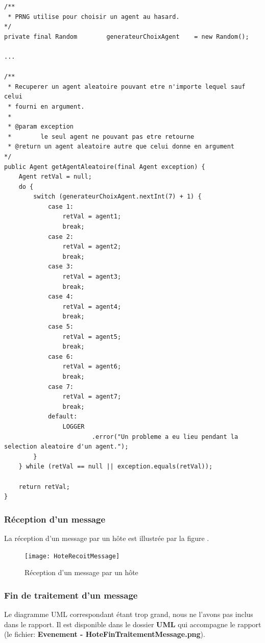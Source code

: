 \documentclass[a4paper,11pt]{article}
\begin{document}
\begin{lstlisting}[caption=Utilisation des variables aléatoires pour sélectionner un agent]
/**
 * PRNG utilise pour choisir un agent au hasard.
*/
private final Random		generateurChoixAgent	= new Random();
	
...

/**
 * Recuperer un agent aleatoire pouvant etre n'importe lequel sauf celui
 * fourni en argument.
 * 
 * @param exception
 *        le seul agent ne pouvant pas etre retourne
 * @return un agent aleatoire autre que celui donne en argument
*/
public Agent getAgentAleatoire(final Agent exception) {
	Agent retVal = null;
	do {
		switch (generateurChoixAgent.nextInt(7) + 1) {
			case 1:
				retVal = agent1;
				break;
			case 2:
				retVal = agent2;
				break;
			case 3:
				retVal = agent3;
				break;
			case 4:
				retVal = agent4;
				break;
			case 5:
				retVal = agent5;
				break;
			case 6:
				retVal = agent6;
				break;
			case 7:
				retVal = agent7;
				break;
			default:
				LOGGER
						.error("Un probleme a eu lieu pendant la selection aleatoire d'un agent.");
		}
	} while (retVal == null || exception.equals(retVal));
	
	return retVal;
}
\end{lstlisting}

\clearpage











\subsubsection{Réception d'un message}
La réception d'un message par un hôte est illustrée par la figure .

\begin{figure}[h!t]
  \centering
    \texttt{[image: HoteRecoitMessage]}
  \caption{Réception d'un message par un hôte}
  \label{fig:hote-recoit-message}
\end{figure}








\subsubsection{Fin de traitement d'un message}
Le diagramme UML correspondant étant trop grand, nous ne l'avons pas inclus dans le rapport. Il est disponible dans le dossier \textbf{UML} qui accompagne le rapport (le fichier: \textbf{Evenement - HoteFinTraitementMessage.png}).
\end{document}

